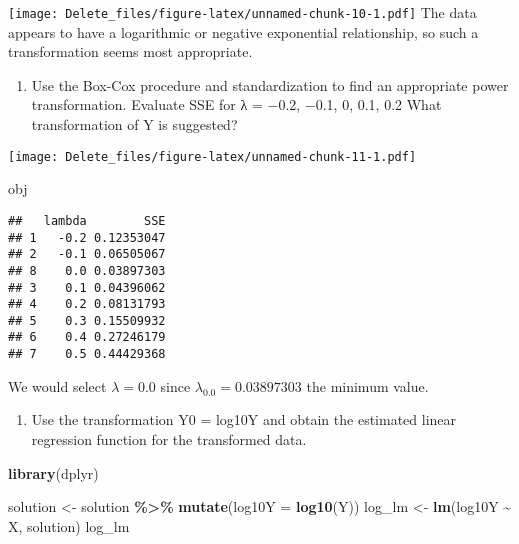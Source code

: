 \documentclass[
]{article}
\newenvironment{Shaded}{\begin{snugshade}}{\end{snugshade}}
\newcommand{\AttributeTok}[1]{\textcolor[rgb]{0.13,0.29,0.53}{#1}}
\newcommand{\FloatTok}[1]{\textcolor[rgb]{0.00,0.00,0.81}{#1}}
\newcommand{\FunctionTok}[1]{\textcolor[rgb]{0.13,0.29,0.53}{\textbf{#1}}}
\newcommand{\NormalTok}[1]{#1}
\newcommand{\OtherTok}[1]{\textcolor[rgb]{0.56,0.35,0.01}{#1}}
\newcommand{\SpecialCharTok}[1]{\textcolor[rgb]{0.81,0.36,0.00}{\textbf{#1}}}
\providecommand{\tightlist}{%
  \setlength{\itemsep}{0pt}\setlength{\parskip}{0pt}}
\begin{document}
\texttt{[image: Delete\_files/figure-latex/unnamed-chunk-10-1.pdf]} The
data appears to have a logarithmic or negative exponential relationship,
so such a transformation seems most appropriate.

\begin{enumerate}
\def\labelenumi{(\alph{enumi})}
\setcounter{enumi}{1}
\tightlist
\item
  Use the Box-Cox procedure and standardization to find an appropriate
  power transformation. Evaluate SSE for λ = −0.2, −0.1, 0, 0.1, 0.2
  What transformation of Y is suggested?
\end{enumerate}

\begin{Shaded}
\end{Shaded}

\texttt{[image: Delete\_files/figure-latex/unnamed-chunk-11-1.pdf]}

\begin{Shaded}
\begin{Highlighting}[]
\NormalTok{obj}
\end{Highlighting}
\end{Shaded}

\begin{verbatim}
##   lambda        SSE
## 1   -0.2 0.12353047
## 2   -0.1 0.06505067
## 8    0.0 0.03897303
## 3    0.1 0.04396062
## 4    0.2 0.08131793
## 5    0.3 0.15509932
## 6    0.4 0.27246179
## 7    0.5 0.44429368
\end{verbatim}

We would select \(\lambda = 0.0\) since \(\lambda_{0.0} = 0.03897303\)
the minimum value.

\begin{enumerate}
\def\labelenumi{(\alph{enumi})}
\setcounter{enumi}{2}
\tightlist
\item
  Use the transformation Y0 = log10Y and obtain the estimated linear
  regression function for the transformed data.
\end{enumerate}

\begin{Shaded}
\begin{Highlighting}[]
\FunctionTok{library}\NormalTok{(dplyr)}

\NormalTok{solution }\OtherTok{\textless{}{-}}\NormalTok{ solution }\SpecialCharTok{\%\textgreater{}\%}
 \FunctionTok{mutate}\NormalTok{(}\AttributeTok{log10Y =} \FunctionTok{log10}\NormalTok{(Y))}
\NormalTok{log\_lm }\OtherTok{\textless{}{-}} \FunctionTok{lm}\NormalTok{(log10Y }\SpecialCharTok{\textasciitilde{}}\NormalTok{ X, solution)}
\NormalTok{log\_lm}
\end{Highlighting}
\end{Shaded}
\end{document}
